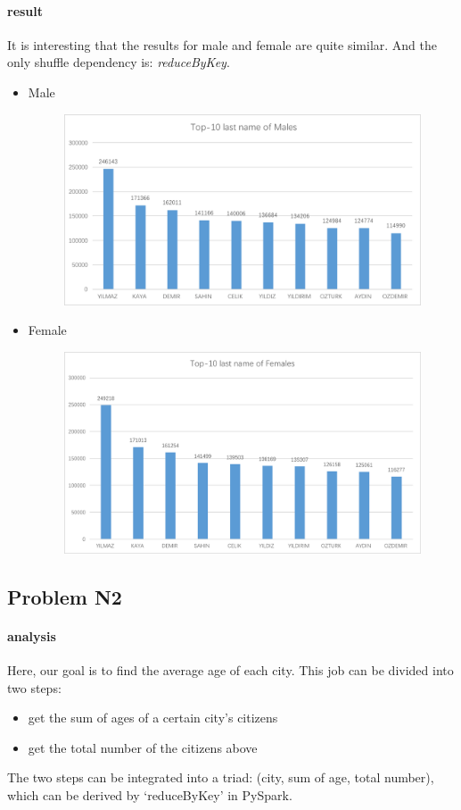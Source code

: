 \documentclass{article}
\begin{document}
\paragraph{result}
It is interesting that the results for male and female are quite similar. And the only shuffle dependency is: \emph{reduceByKey}.
\begin{itemize}
\item Male
\begin{figure}[ht]
\centering
\includegraphics[width=0.7\linewidth]{N1_1}
\end{figure}
\item Female
\begin{figure}[ht]
\centering
\includegraphics[width=0.7\linewidth]{N1_2}
\end{figure}
\end{itemize}



\subsection{Problem N2}
\paragraph{analysis}
Here, our goal is to find the average age of each city. This job can be divided into two steps:
\begin{itemize}
\item get the sum of ages of a certain city's citizens
\item get the total number of the citizens above
\end{itemize}
The two steps can be integrated into a triad: (city, sum of age, total number), which can be derived by `reduceByKey' in PySpark.
\end{document}
